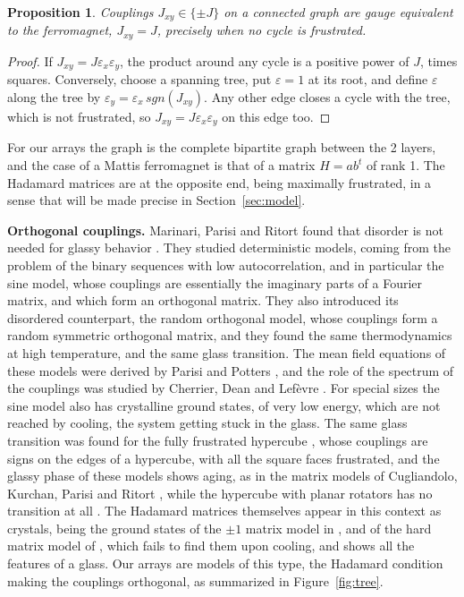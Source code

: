 \documentclass[11pt,a4paper]{article}
\newtheorem{prop}[thm]{Proposition}
\theoremstyle{remark}
\begin{document}
\begin{samepage}
\begin{prop}\label{prop:mattis}
Couplings $J_{xy}\in\{\pm J\}$ on a connected graph are gauge equivalent to the ferromagnet, $J_{xy}=J$, precisely when no cycle is frustrated.
\end{prop}
\end{samepage}

\begin{proof}
If $J_{xy}=J\varepsilon_x\varepsilon_y$, the product around any cycle is a positive power of $J$, times squares. Conversely, choose a spanning tree, put $\varepsilon=1$ at its root, and define $\varepsilon$ along the tree by $\varepsilon_y=\varepsilon_x\,sgn(J_{xy})$. Any other edge closes a cycle with the tree, which is not frustrated, so $J_{xy}=J\varepsilon_x\varepsilon_y$ on this edge too.
\end{proof}

For our arrays the graph is the complete bipartite graph between the 2 layers, and the case of a Mattis ferromagnet is that of a matrix $H=ab^t$ of rank 1. The Hadamard matrices are at the opposite end, being maximally frustrated, in a sense that will be made precise in Section~\ref{sec:model}.

\medskip

\noindent\textbf{Orthogonal couplings.} Marinari, Parisi and Ritort found that disorder is not needed for glassy behavior \cite{mp1,mp2}. They studied deterministic models, coming from the problem of the binary sequences with low autocorrelation, and in particular the sine model, whose couplings are essentially the imaginary parts of a Fourier matrix, and which form an orthogonal matrix. They also introduced its disordered counterpart, the random orthogonal model, whose couplings form a random symmetric orthogonal matrix, and they found the same thermodynamics at high temperature, and the same glass transition. The mean field equations of these models were derived by Parisi and Potters \cite{ppo}, and the role of the spectrum of the couplings was studied by Cherrier, Dean and Lef\`evre \cite{cdl}. For special sizes the sine model also has crystalline ground states, of very low energy, which are not reached by cooling, the system getting stuck in the glass. The same glass transition was found for the fully frustrated hypercube \cite{mp3}, whose couplings are signs on the edges of a hypercube, with all the square faces frustrated, and the glassy phase of these models shows aging, as in the matrix models of Cugliandolo, Kurchan, Parisi and Ritort \cite{ckp}, while the hypercube with planar rotators has no transition at all \cite{mp3}. The Hadamard matrices themselves appear in this context as crystals, being the ground states of the $\pm1$ matrix model in \cite{ckp}, and of the hard matrix model of \cite{del}, which fails to find them upon cooling, and shows all the features of a glass. Our arrays are models of this type, the Hadamard condition making the couplings orthogonal, as summarized in Figure~\ref{fig:tree}.
\end{document}
